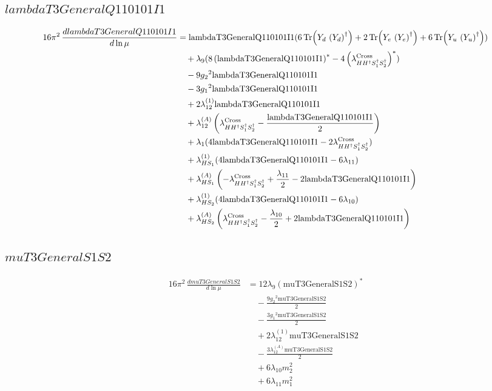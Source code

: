 \documentclass[10pt,a4paper]{article}
\begin{document}
\subsection*{$lambdaT3GeneralQ110101I1$}
\begin{align*}
16\pi^2\,\frac{d lambdaT3GeneralQ110101I1}{d\ln\mu} &=\text{lambdaT3GeneralQ110101I1} (6 \operatorname{Tr}\!\left({Y_d}\,\left({Y_d}\right)^{\dagger}\right)+2 \operatorname{Tr}\!\left({Y_e}\,\left({Y_e}\right)^{\dagger}\right)+6 \operatorname{Tr}\!\left({Y_u}\,\left({Y_u}\right)^{\dagger}\right)) \\
&\quad +{\lambda_{9}} (8 \left(\text{lambdaT3GeneralQ110101I1}\right)^{*}-4 \left({\lambda_{H H^\dagger S_1^\dagger S_2^\dagger}^{\rm Cross}}\right)^{*}) \\
&\quad -9 {g_2}^2 \text{lambdaT3GeneralQ110101I1} \\
&\quad -3 {g_1}^2 \text{lambdaT3GeneralQ110101I1} \\
&\quad +2 {\lambda_{12}^{(1)}} \text{lambdaT3GeneralQ110101I1} \\
&\quad +{\lambda_{12}^{(A)}} \left({\lambda_{H H^\dagger S_1^\dagger S_2^\dagger}^{\rm Cross}}-\frac{\text{lambdaT3GeneralQ110101I1}}{2}\right) \\
&\quad +{\lambda_1} (4 \text{lambdaT3GeneralQ110101I1}-2 {\lambda_{H H^\dagger S_1^\dagger S_2^\dagger}^{\rm Cross}}) \\
&\quad +{\lambda_{HS_1}^{(1)}} (4 \text{lambdaT3GeneralQ110101I1}-6 {\lambda_{11}}) \\
&\quad +{\lambda_{HS_1}^{(A)}} \left(-{\lambda_{H H^\dagger S_1^\dagger S_2^\dagger}^{\rm Cross}}+\frac{{\lambda_{11}}}{2}-2 \text{lambdaT3GeneralQ110101I1}\right) \\
&\quad +{\lambda_{HS_2}^{(1)}} (4 \text{lambdaT3GeneralQ110101I1}-6 {\lambda_{10}}) \\
&\quad +{\lambda_{HS_2}^{(A)}} \left({\lambda_{H H^\dagger S_1^\dagger S_2^\dagger}^{\rm Cross}}-\frac{{\lambda_{10}}}{2}+2 \text{lambdaT3GeneralQ110101I1}\right) \\
\end{align*}
\subsection*{$muT3GeneralS1S2$}
\begin{align*}
16\pi^2\,\frac{d muT3GeneralS1S2}{d\ln\mu} &=12 {\lambda_{9}} \left(\text{muT3GeneralS1S2}\right)^{*} \\
&\quad -\frac{9 {g_2}^2 \text{muT3GeneralS1S2}}{2} \\
&\quad -\frac{3 {g_1}^2 \text{muT3GeneralS1S2}}{2} \\
&\quad +2 {\lambda_{12}^{(1)}} \text{muT3GeneralS1S2} \\
&\quad -\frac{3 {\lambda_{12}^{(A)}} \text{muT3GeneralS1S2}}{2} \\
&\quad +6 {\lambda_{10}} {m_2^2} \\
&\quad +6 {\lambda_{11}} {m_1^2} \\
\end{align*}
\end{document}
